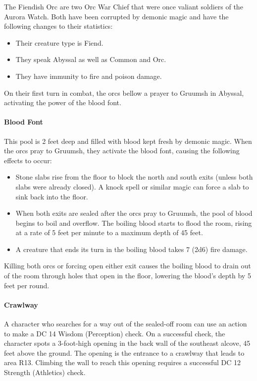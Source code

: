\documentclass[10pt,a4paper,twoside,bg=print,twocolumn,openany,nodeprecatedcode]{dndbook}
\begin{document}
The Fiendish Orc are two Orc War Chief that were once valiant soldiers of the Aurora Watch. Both have been corrupted by demonic magic and have the following changes to their statistics:


\begin{itemize}
\item Their creature type is Fiend.
\item They speak Abyssal as well as Common and Orc.
\item They have immunity to fire and poison damage.
\end{itemize}

On their first turn in combat, the orcs bellow a prayer to Gruumsh in Abyssal, activating the power of the blood font.

\paragraph{Blood Font}
This pool is 2 feet deep and filled with blood kept fresh by demonic magic. When the orcs pray to Gruumsh, they activate the blood font, causing the following effects to occur:


\begin{itemize}
\item Stone slabs rise from the floor to block the north and south exits (unless both slabs were already closed). A knock spell or similar magic can force a slab to sink back into the floor.
\item When both exits are sealed after the orcs pray to Gruumsh, the pool of blood begins to boil and overflow. The boiling blood starts to flood the room, rising at a rate of 5 feet per minute to a maximum depth of 45 feet.
\item A creature that ends its turn in the boiling blood takes 7 (2d6) fire damage.
\end{itemize}

Killing both orcs or forcing open either exit causes the boiling blood to drain out of the room through holes that open in the floor, lowering the blood's depth by 5 feet per round.

\paragraph{Crawlway}
A character who searches for a way out of the sealed-off room can use an action to make a DC 14 Wisdom (Perception) check. On a successful check, the character spots a 3-foot-high opening in the back wall of the southeast alcove, 45 feet above the ground. The opening is the entrance to a crawlway that leads to area R13. Climbing the wall to reach this opening requires a successful DC 12 Strength (Athletics) check.
\end{document}
